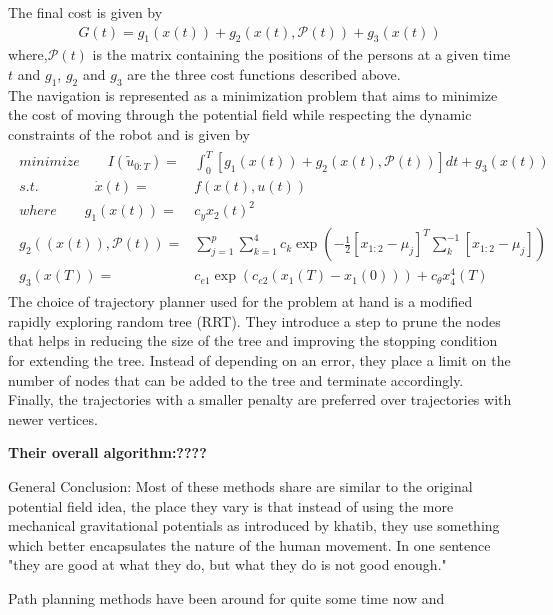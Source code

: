 The final cost is given by 
\begin{align}
G(t) = g_{1}(x(t)) + g_{2}(x(t), \mathcal{P}(t)) + g_{3}(x(t))
\end{align}
where,$\mathcal{P}(t)$ is the matrix containing the positions of the persons at a given time $t$ and $g_{1}$, $g_{2}$ and $g_{3}$ are the three cost functions described above.\\
The navigation is represented as a minimization problem that aims to minimize the cost of moving through the potential field while respecting the dynamic constraints of the robot and is given by
\begin{align}
\begin{split}
minimize \qquad I(\tilde{u}_{0:T}) = &\int_{0}^{T} [g_{1}(x(t)) + g_{2}(x(t), \mathcal{P}(t))]dt + g_{3}(x(t))\\
s.t. \qquad \qquad \dot{x}(t) = & f(x(t),u(t)) \\
where \qquad g_{1}(x(t)) = &c_{y}x_{2}(t)^{2}\\
		g_{2}((x(t)), \mathcal{P}(t)) = &\sum_{j=1}^{p} \sum_{k=1}^{4} c_{k}\exp(-\frac{1}{2}[x_{1:2} - \mu_{j}]^{T}\sum^{-1}_{k}[x_{1:2} - \mu_{j}])\\
		g_{3}(x(T)) = & c_{e1}\exp(c_{e2}(x_{1}(T) - x_{1}(0))) + c_{\theta}x_{4}^{4}(T)
\end{split}
\end{align}
The choice of trajectory planner used for the problem at hand is a modified rapidly exploring random tree (RRT). They introduce a step to prune the nodes that helps in reducing the size of the tree and improving the stopping condition for extending the tree. Instead of depending on an error, they place a limit on the number of nodes that can be added to the tree and terminate accordingly. Finally, the trajectories with a smaller penalty are preferred over trajectories with newer vertices.

\textbf{Their overall algorithm:????}

General Conclusion:
Most of these methods share are similar to the original potential field idea, the place they vary is that instead of using the more mechanical gravitational potentials as introduced by khatib, they use something which better encapsulates the nature of the human movement.
In one sentence "they are good at what they do, but what they do is not good enough."

Path planning methods have been around for quite some time now and 


